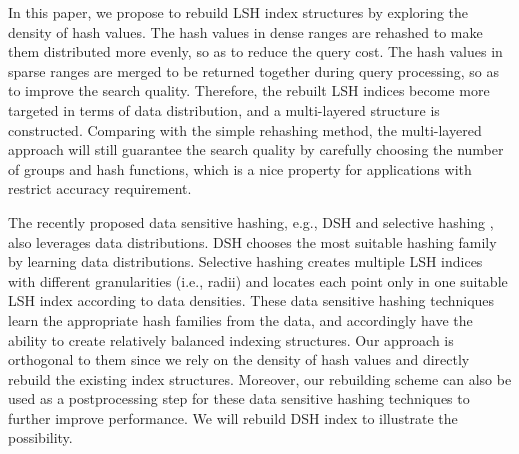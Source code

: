 In this paper, we propose to rebuild LSH index structures by exploring the density of hash values. The hash values in dense ranges are rehashed to make them distributed more evenly, so as to reduce the query cost. The hash values in sparse ranges are merged to be returned together during query processing, so as to improve the search quality. Therefore, the rebuilt LSH indices become more targeted in terms of data distribution, and a multi-layered structure is constructed. Comparing with the simple rehashing method, the multi-layered approach will still guarantee the search quality by carefully choosing the number of groups and hash functions, which is a nice property for applications with restrict accuracy requirement.





 The recently proposed data sensitive hashing, e.g., DSH \cite{Gao:2014:DDS:2588555.2588565} and selective hashing \cite{Gao:2015:SHC:2783258.2783284}, also leverages data distributions. DSH \cite{Gao:2014:DDS:2588555.2588565} chooses the most suitable hashing family by learning data distributions. Selective hashing \cite{Gao:2015:SHC:2783258.2783284} creates multiple LSH indices with different granularities (i.e., radii) and locates each point only in one suitable LSH index according to data densities. These data sensitive hashing techniques learn the appropriate hash families from the data, and accordingly have the ability to create relatively balanced indexing structures. Our approach is orthogonal to them since we rely on the density of hash values and directly rebuild the existing index structures. Moreover, our rebuilding scheme can also be used as a postprocessing step for these data sensitive hashing techniques to further improve performance. We will rebuild DSH index to illustrate the possibility.


